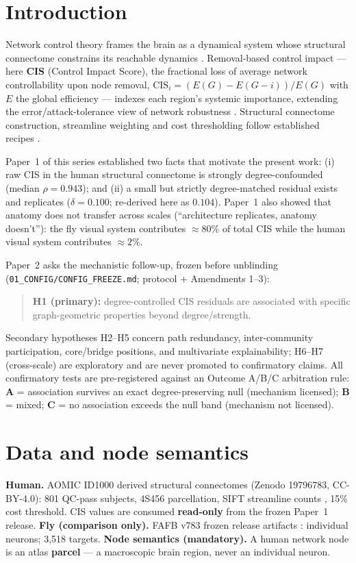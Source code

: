 \documentclass[11pt,a4paper]{article}
\newcommand{\del}{\delta}
\begin{document}
\section{Introduction}
Network control theory frames the brain as a dynamical system whose
structural connectome constrains its reachable dynamics
\cite{gu2015,tang2018,liu2011}. Removal-based control impact --- here
\textbf{CIS} (Control Impact Score), the fractional loss of average network
controllability upon node removal,
$\mathrm{CIS}_i=(E(G)-E(G-i))/E(G)$ with $E$ the global efficiency
\cite{latora2001} --- indexes each region's systemic importance, extending
the error/attack-tolerance view of network robustness \cite{albert2000}.
Structural connectome construction, streamline weighting and cost
thresholding follow established recipes \cite{hagmann2008,smith2015,achard2007}.

Paper~1 of this series \cite{paper1} established two facts that motivate
the present work: (i) raw CIS in the human structural connectome is
strongly degree-confounded (median $\rho=0.943$); and (ii) a small but
strictly degree-matched residual exists and replicates ($\del=0.100$;
re-derived here as $0.104$). Paper~1 also showed that anatomy does not
transfer across scales (``architecture replicates, anatomy doesn't''):
the fly visual system contributes $\approx 80\%$ of total CIS while the
human visual system contributes $\approx 2\%$.

Paper~2 asks the mechanistic follow-up, frozen before unblinding
(\texttt{01\_CONFIG/CONFIG\_FREEZE.md}; protocol + Amendments 1--3):
\begin{quote}
\textbf{H1 (primary):} degree-controlled CIS residuals are associated with
specific graph-geometric properties beyond degree/strength.
\end{quote}
Secondary hypotheses H2--H5 concern path redundancy, inter-community
participation, core/bridge positions, and multivariate explainability;
H6--H7 (cross-scale) are exploratory and are never promoted to
confirmatory claims. All confirmatory tests are pre-registered against an
Outcome A/B/C arbitration rule: \textbf{A} = association survives an exact
degree-preserving null (mechanism licensed); \textbf{B} = mixed;
\textbf{C} = no association exceeds the null band (mechanism not licensed).

\section{Data and node semantics}
\textbf{Human.} AOMIC ID1000 derived structural connectomes
\cite{snoek2021} (Zenodo 19796783, CC-BY-4.0): 801 QC-pass subjects, 4S456
parcellation, SIFT streamline counts \cite{smith2015}, 15\% cost threshold.
CIS values are consumed \textbf{read-only} from the frozen Paper~1 release.
\textbf{Fly (comparison only).} FAFB v783 frozen release artifacts
\cite{dorkenwald2024,dorkenwald2023}: individual neurons; 3{,}518 targets.
\textbf{Node semantics (mandatory).} A human network node is an atlas
\textbf{parcel} --- a macroscopic brain region, never an individual neuron.
\end{document}
